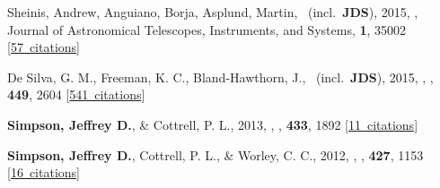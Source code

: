\item[{\color{numcolor}\scriptsize4}] Sheinis, Andrew, Anguiano, Borja, Asplund, Martin, \etal\ (incl.\ \textbf{JDS}), 2015, , Journal of Astronomical Telescopes, Instruments, and Systems, \textbf{1}, 35002 [\href{https://ui.adsabs.harvard.edu/#abs/2015JATIS...1c5002S}{57~citations}]

\item[{\color{numcolor}\scriptsize3}] De Silva, G. M., Freeman, K. C., Bland-Hawthorn, J., \etal\ (incl.\ \textbf{JDS}), 2015, , \mnras, \textbf{449}, 2604 [\href{https://ui.adsabs.harvard.edu/#abs/2015MNRAS.449.2604D}{541~citations}]

\item[{\color{numcolor}\scriptsize2}] \textbf{Simpson, Jeffrey D.}, \& Cottrell, P. L., 2013, , \mnras, \textbf{433}, 1892 [\href{https://ui.adsabs.harvard.edu/#abs/2013MNRAS.433.1892S}{11~citations}]

\item[{\color{numcolor}\scriptsize1}] \textbf{Simpson, Jeffrey D.}, Cottrell, P. L., \& Worley, C. C., 2012, , \mnras, \textbf{427}, 1153 [\href{https://ui.adsabs.harvard.edu/#abs/2012MNRAS.427.1153S}{16~citations}]